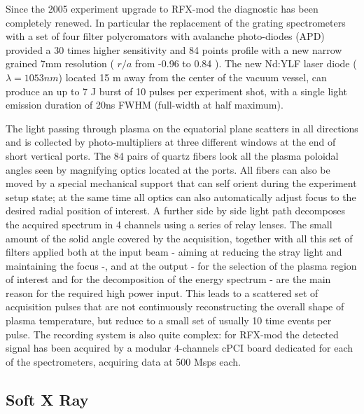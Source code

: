 Since the 2005 experiment upgrade to RFX-mod the diagnostic has been completely renewed. In particular the replacement of the grating spectrometers with a set of four filter polycromators with avalanche photo-diodes (APD) provided a 30 times higher sensitivity and 84 points profile with a new narrow grained 7mm resolution ( $r/a$ from -0.96 to 0.84 ).
The new Nd:YLF laser diode ($\lambda=1053 nm$) located 15 m away from the center of the vacuum vessel, can produce an up to 7 J burst of 10 pulses per experiment shot, with a single light emission duration of 20ns FWHM (full-width at half maximum).

The light passing through plasma on the equatorial plane scatters in all directions and is collected by photo-multipliers at three different windows at the end of short vertical ports. The 84 pairs of quartz fibers look all the plasma poloidal angles seen by magnifying optics located at the ports. All fibers can also be moved by a special mechanical support that can self orient during the experiment setup state; at the same time all optics can also automatically adjust focus to the desired radial position of interest.
A further side by side light path decomposes the acquired spectrum in 4 channels using a series of relay lenses.
%
The small amount of the solid angle covered by the acquisition, together with all this set of filters applied both at the input beam - aiming at reducing the stray light and maintaining the focus -, and at the output - for the selection of the plasma region of interest and for the decomposition of the energy spectrum - are the main reason for the required high power input.
%
This leads to a scattered set of acquisition pulses that are not continuously reconstructing the overall shape of plasma temperature, but reduce to a small set of usually 10 time events per pulse.
%
The recording system is also quite complex: for RFX-mod the detected signal has been acquired by a modular 4-channels cPCI board dedicated for each of the spectrometers, acquiring data at 500 Msps each.

\subsection{Soft X Ray}


